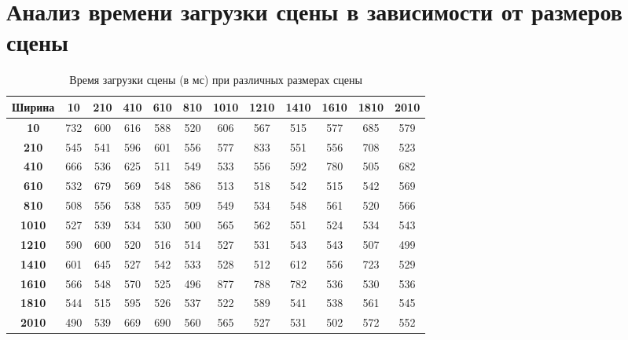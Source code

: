 \section{Анализ времени загрузки сцены в зависимости от размеров сцены}

\begin{table}[h!]
\centering
\caption{Время загрузки сцены (в мс) при различных размерах сцены}
\label{tab:scene_loading_time}
\begin{tabular}{|c|*{11}{c|}} %
\hline
\textbf{Ширина} & \textbf{10} & \textbf{210} & \textbf{410} & \textbf{610} & \textbf{810} & \textbf{1010} & \textbf{1210} & \textbf{1410} & \textbf{1610} & \textbf{1810} & \textbf{2010} \\ \hline
\textbf{10} & 732 & 600 & 616 & 588 & 520 & 606 & 567 & 515 & 577 & 685 & 579 \\ \hline
\textbf{210} & 545 & 541 & 596 & 601 & 556 & 577 & 833 & 551 & 556 & 708 & 523 \\ \hline %
\textbf{410} & 666 & 536 & 625 & 511 & 549 & 533 & 556 & 592 & 780 & 505 & 682 \\ \hline
\textbf{610} & 532 & 679 & 569 & 548 & 586 & 513 & 518 & 542 & 515 & 542 & 569 \\ \hline
\textbf{810} & 508 & 556 & 538 & 535 & 509 & 549 & 534 & 548 & 561 & 520 & 566 \\ \hline
\textbf{1010} & 527 & 539 & 534 & 530 & 500 & 565 & 562 & 551 & 524 & 534 & 543 \\ \hline
\textbf{1210} & 590 & 600 & 520 & 516 & 514 & 527 & 531 & 543 & 543 & 507 & 499 \\ \hline
\textbf{1410} & 601 & 645 & 527 & 542 & 533 & 528 & 512 & 612 & 556 & 723 & 529 \\ \hline
\textbf{1610} & 566 & 548 & 570 & 525 & 496 & 877 & 788 & 782 & 536 & 530 & 536 \\ \hline
\textbf{1810} & 544 & 515 & 595 & 526 & 537 & 522 & 589 & 541 & 538 & 561 & 545 \\ \hline
\textbf{2010} & 490 & 539 & 669 & 690 & 560 & 565 & 527 & 531 & 502 & 572 & 552 \\ \hline
\end{tabular}
\end{table}

